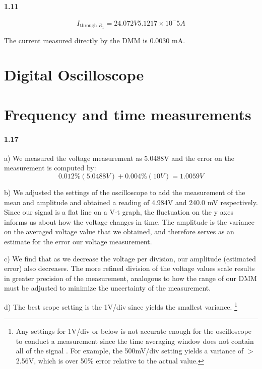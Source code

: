 \documentclass[authoryear, 12pt,5p, times]{elsarticle}
\begin{document}
\paragraph{\textbf{1.11}}
\begin{equation}
I_{\text{through }R_1} = 24.072V 
5.1217\times10^-5A
\end{equation}

The current measured directly by the DMM is 0.0030 mA. 
\section{Digital Oscilloscope}
\section{Frequency and time measurements}
\paragraph{\textbf{1.17}}
a) We measured the voltage measurement as 5.0488V and the error on the measurement is computed by: 
\begin{equation*}
0.012\%(5.0488V)+0.004\%(10V) = 1.0059V
\end{equation*}
\par b) We adjusted the settings of the oscilloscope to add the  measurement of the mean and amplitude and obtained a reading of 4.984V and 240.0 mV respectively. Since our signal is a flat line on a V-t graph, the fluctuation on the y axes informs us about how the voltage changes in time. The amplitude is the variance on the averaged voltage value that we obtained, and therefore serves as an estimate for the error our voltage measurement. 
\par
c) We find that as we decrease the voltage per division, our amplitude (estimated error) also decreases. The more refined division of the voltage values scale results in greater precision of the measurement, analogous to how the range of our DMM must be adjusted to minimize the uncertainty of the  measurement.
\par
d) The best scope setting is the 1V/div since yields the smallest variance. \footnote{Any settings for 1V/div  or below is not accurate enough  for the oscilloscope to conduct a measurement since the time averaging window does not contain all  of the signal . For example, the 500mV/div setting yields a variance of $>$2.56V, which is over 50\% error relative to the actual value.}
\end{document}
